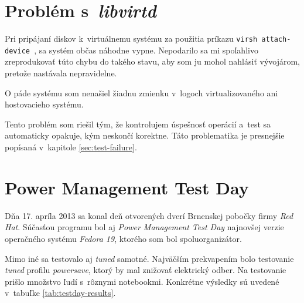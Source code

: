 %
%

\section{Problém s~\emph{libvirtd}}
\label{sec:libvirt-problem}

Pri pripájaní diskov k~virtuálnemu systému za použitia príkazu \texttt{virsh
attach-device }, sa systém občas náhodne vypne. Nepodarilo sa mi spoľahlivo
zreprodukovať túto chybu do takého stavu, aby som ju mohol nahlásiť vývojárom,
pretože nastávala nepravidelne. 

O páde systému som nenašiel žiadnu zmienku v~logoch virtualizovaného ani
hostovacieho systému. 

Tento problém som riešil tým, že kontrolujem úspešnosť operácií a~test sa
automaticky opakuje, kým neskončí korektne. Táto problematika je presnejšie
popísaná v~kapitole \ref{sec:test-failure}.

%
%

\section{Power Management Test Day}

Dňa 17. apríla 2013 sa konal deň otvorených dverí Brnenskej pobočky firmy
\emph{Red Hat}. Súčasťou programu bol aj \emph{Power Management Test Day}
najnovšej verzie operačného systému \emph{Fedora 19}, ktorého som bol
spoluorganizátor. 

Mimo iné sa testovalo aj \emph{tuned} samotné. Najväčším prekvapením bolo
testovanie \emph{tuned} profilu \emph{powersave}, ktorý by mal znižovať
elektrický odber. Na testovanie prišlo množstvo ľudí s~rôznymi notebookmi.
Konkrétne výsledky sú uvedené v~tabuľke \ref{tab:testday-results}.


